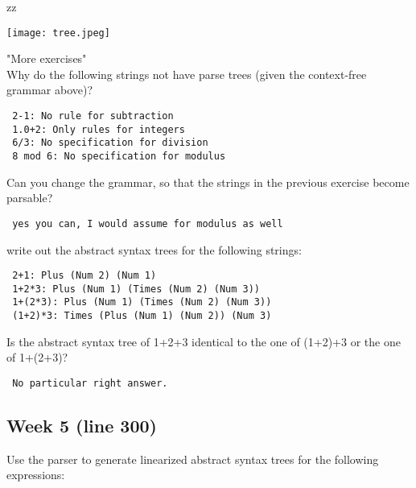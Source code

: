 zz\documentclass{article}
\theoremstyle{theorem}
\theoremstyle{definition}
\theoremstyle{remark}
\begin{document}
\texttt{[image: tree.jpeg]}

{\large "More exercises"\\}
Why do the following strings not have parse trees (given the context-free grammar above)?

\begin{verbatim}
 2-1: No rule for subtraction
 1.0+2: Only rules for integers
 6/3: No specification for division
 8 mod 6: No specification for modulus
\end{verbatim}

Can you change the grammar, so that the strings in the previous exercise become parsable?

\begin{verbatim}
 yes you can, I would assume for modulus as well
\end{verbatim}

write out the abstract syntax trees for the following strings:
\begin{verbatim}
 2+1: Plus (Num 2) (Num 1)
 1+2*3: Plus (Num 1) (Times (Num 2) (Num 3))
 1+(2*3): Plus (Num 1) (Times (Num 2) (Num 3))
 (1+2)*3: Times (Plus (Num 1) (Num 2)) (Num 3)
\end{verbatim}

Is the abstract syntax tree of 1+2+3 identical to the one of (1+2)+3 or the one of 1+(2+3)?
\begin{verbatim}
 No particular right answer.
\end{verbatim}

\subsection{Week 5 (line 300)} 

Use the parser to generate linearized abstract syntax trees for the following expressions:
\end{document}
